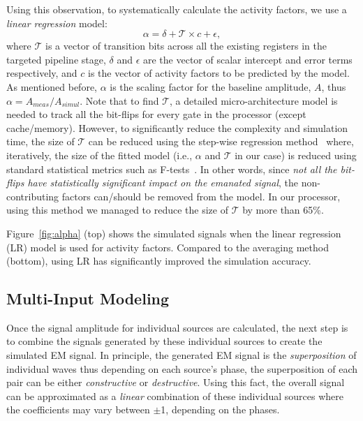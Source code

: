\documentclass[11 pt]{article}
\begin{document}
Using this observation, to systematically calculate the activity factors, we use a \textit{linear regression} model:
\begin{equation}
\alpha = \delta + \mathcal{T}\times c + \epsilon,
\end{equation}
where $\mathcal{T}$ is a vector of transition bits across all the existing registers in the targeted pipeline stage, $\delta$ and $\epsilon$ are the vector of scalar intercept and error terms respectively, and $c$ is the vector of activity factors to be predicted by the model. As mentioned before, $\alpha$ is the scaling factor for the baseline amplitude, $A$, thus $\alpha = A_{meas}/A_{simul}$.  Note that to find $\mathcal{T}$, a detailed micro-architecture model is needed to track all the bit-flips for every gate in the processor (except cache/memory). However, to significantly reduce the complexity and simulation time, the size of $\mathcal{T}$ can be reduced using the step-wise regression method~\cite{f-test} where, iteratively, the size of the fitted model (i.e., $\alpha$ and $\mathcal{T}$ in our case) is reduced using standard statistical metrics such as F-tests~\cite{f-test}. In other words, since \emph{not all the bit-flips have statistically significant impact on the emanated signal}, the non-contributing factors can/should be removed from the model.  In our processor, using this method we managed to reduce the size of $\mathcal{T}$ by more than 65\%.

Figure~\ref{fig:alpha} (top) shows the simulated signals when the linear regression (LR) model is used for activity factors. Compared to the averaging method (bottom), using LR has significantly improved the simulation accuracy.

\subsection{Multi-Input Modeling}
Once the signal amplitude for individual sources are calculated, the next step is to combine the signals generated by these individual sources to create the simulated EM signal.
In principle, the generated EM signal is the \textit{superposition} of individual waves thus depending on each source's phase, the superposition of each pair can be either \textit{constructive} or \textit{destructive}. Using this fact, the overall signal can be approximated as a \textit{linear} combination of these individual sources where the coefficients may vary between $\pm$1, depending on the phases.
\end{document}

